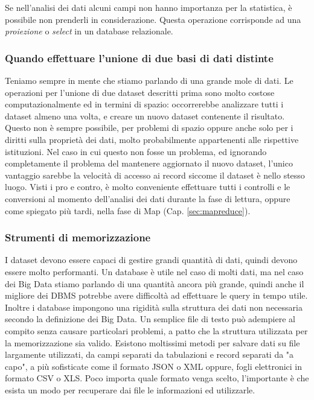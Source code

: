\begin{itemize}
Se nell'analisi dei dati alcuni campi non hanno importanza per la statistica, è possibile non prenderli in considerazione. Questa operazione corrisponde ad una \emph{proiezione} o \emph{select} in un database relazionale.

\end{itemize}

\subsubsection{Quando effettuare l'unione di due basi di dati distinte}
Teniamo sempre in mente che stiamo parlando di una grande mole di dati. Le operazioni per l'unione di due dataset descritti prima sono molto costose computazionalmente ed in termini di spazio: occorrerebbe analizzare tutti i dataset almeno una volta, e creare un nuovo dataset contenente il risultato. Questo non è sempre possibile, per problemi di spazio oppure anche solo per i diritti sulla proprietà dei dati, molto probabilmente appartenenti alle rispettive istituzioni. Nel caso in cui questo non fosse un problema, ed ignorando completamente il problema del mantenere aggiornato il nuovo dataset, l'unico vantaggio sarebbe la velocità di accesso ai record siccome il dataset è nello stesso luogo. Visti i pro e contro, è molto conveniente effettuare tutti i controlli e le conversioni al momento dell'analisi dei dati durante la fase di lettura, oppure come spiegato più tardi, nella fase di Map (Cap. \ref{sec:mapreduce}).

\subsubsection{Strumenti di memorizzazione}
I dataset devono essere capaci di gestire grandi quantità di dati, quindi devono essere molto performanti. Un database è utile nel caso di molti dati, ma nel caso dei Big Data stiamo parlando di una quantità ancora più grande, quindi anche il migliore dei DBMS potrebbe avere difficoltà ad effettuare le query in tempo utile. Inoltre i database impongono una rigidità sulla struttura dei dati non necessaria secondo la definizione dei Big Data. Un semplice file di testo può adempiere al compito senza causare particolari problemi, a patto che la struttura utilizzata per la memorizzazione sia valido. Esistono moltissimi metodi per salvare dati su file largamente utilizzati, da campi separati da tabulazioni e record separati da "a capo", a più sofisticate come il formato JSON o XML oppure, fogli elettronici in formato CSV o XLS. Poco importa quale formato venga scelto, l'importante è che esista un modo per recuperare dai file le informazioni ed utilizzarle.

